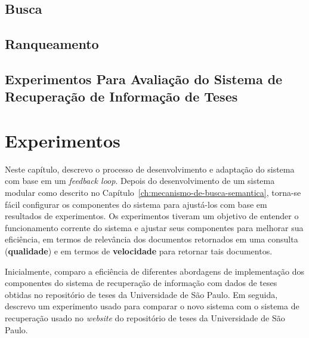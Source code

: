 \documentclass[
	12pt,				%
	openright,			%
	oneside,			%
	a4paper,			%
	english,			%
	french,				%
	spanish,			%
	brazil				%
	]{abntex2}
\begin{document}
\section{Busca}\label{sec:busca}

\section{Ranqueamento}\label{sec:ranqueamento}

\section{Experimentos Para Avaliação do Sistema de Recuperação de Informação de Teses}\label{sec:experimentos-para-avaliacao-do-sistema-de-recuperacao-de-informacao-de-teses}

\chapter{Experimentos}
\label{ch:exper}

Neste capítulo, descrevo o processo de desenvolvimento e adaptação do sistema com base em um \textit{feedback loop}.
Depois do desenvolvimento de um sistema modular como descrito no Capítulo~\ref{ch:mecanismo-de-busca-semantica}, torna-se
fácil configurar os componentes do sistema para ajustá-los com base em resultados de experimentos.
Os experimentos tiveram um objetivo de entender o funcionamento corrente do sistema e ajustar seus componentes
para melhorar sua eficiência, em termos de relevância dos documentos retornados em uma consulta (\textbf{qualidade})
e em termos de \textbf{velocidade} para retornar tais documentos.

Inicialmente, comparo a eficiência de diferentes abordagens de implementação dos componentes do sistema de recuperação
de informação com dados de teses obtidas no repositório de teses da Universidade de São Paulo.
Em seguida, descrevo um experimento usado para comparar o novo sistema com o sistema de recuperação usado no \textit{website}
do repositório de teses da Universidade de São Paulo.
\end{document}
